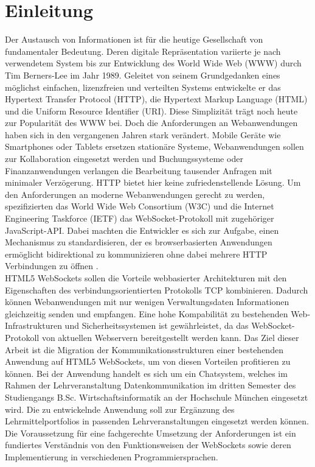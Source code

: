 \documentclass[11pt,a4paper,titlepage]{scrartcl}
\numberwithin{equation}{section}
\begin{document}
\newpage
 \tableofcontents

\newpage

  \pagestyle{headings}

\section{Einleitung}\label{sec:Einleitung}
Der Austausch von Informationen ist für die heutige Gesellschaft von fundamentaler Bedeutung. Deren digitale Repräsentation variierte je nach verwendetem System bis zur Entwicklung des World Wide Web (WWW) durch Tim Berners-Lee im Jahr 1989. Geleitet von seinem Grundgedanken eines möglichst einfachen, lizenzfreien und verteilten Systems entwickelte er das Hypertext Transfer Protocol (HTTP), die Hypertext Markup Language (HTML) und die Uniform Resource Identifier (URI). Diese Simplizität trägt noch heute zur Popularität des WWW bei. Doch die Anforderungen an Webanwendungen haben sich in den vergangenen Jahren stark verändert. Mobile Geräte wie Smartphones oder Tablets ersetzen stationäre Systeme, Webanwendungen sollen zur Kollaboration eingesetzt werden und Buchungssysteme oder Finanzanwendungen verlangen die Bearbeitung tausender Anfragen mit minimaler Verzögerung. HTTP bietet hier keine zufriedenstellende Lösung. Um den Anforderungen an moderne Webanwendungen gerecht zu werden, spezifizierten das World Wide Web Consortium (W3C) und die Internet Engineering Taskforce (IETF) das WebSocket-Protokoll mit zugehöriger JavaScript-API. Dabei machten die Entwickler es sich zur Aufgabe, einen Mechanismus zu standardisieren, der es browserbasierten Anwendungen ermöglicht bidirektional zu kommunizieren ohne dabei mehrere HTTP Verbindungen zu öffnen \autocite{fette_websocket_2011}.\\

\noindent HTML5 WebSockets sollen die Vorteile webbasierter Architekturen mit den Eigenschaften des verbindungsorientierten Protokolls TCP kombinieren. Dadurch können Webanwendungen mit nur wenigen Verwaltungsdaten Informationen gleichzeitig senden und empfangen. Eine hohe Kompabilität zu bestehenden Web-Infrastrukturen und Sicherheitssystemen ist gewährleistet, da das WebSocket-Protokoll von aktuellen Webservern bereitgestellt werden kann. Das Ziel dieser Arbeit ist die Migration der Kommunikationsstrukturen einer bestehenden Anwendung auf HTML5 WebSockets, um von diesen Vorteilen profitieren zu können. Bei der Anwendung handelt es sich um ein Chatsystem, welches im Rahmen der Lehrveranstaltung \glqq Datenkommunikation\grqq{} im dritten Semester des Studiengangs B.Sc. Wirtschaftsinformatik an der Hochschule München eingesetzt wird. Die zu entwickelnde Anwendung soll zur Ergänzung des Lehrmittelportfolios in passenden Lehrveranstaltungen eingesetzt werden können. Die Voraussetzung für eine fachgerechte Umsetzung der Anforderungen ist ein fundiertes Verständnis von den Funktionsweisen der WebSockets sowie deren Implementierung in verschiedenen Programmiersprachen.\\
\end{document}
